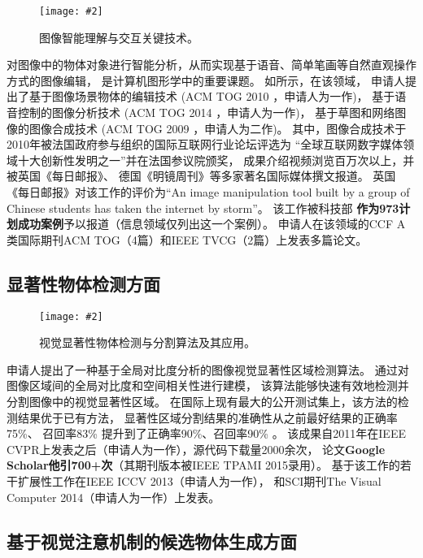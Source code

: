 \documentclass[12pt]{article}
\newcommand{\addImg}[2][1.0]{\texttt{[image: \#2]}}
\newcommand{\myEmph}[1]{\textbf{\textcolor[rgb]{0,0,0.25}{#1}}}
\begin{document}
\begin{figure}[ht]
    \centering
    \addImg[1]{figures/work.jpg}
    \caption{图像智能理解与交互关键技术。}
    \label{fig:interaction}
\end{figure}

对图像中的物体对象进行智能分析，从而实现基于语音、简单笔画等自然直观操作方式的图像编辑，
是计算机图形学中的重要课题。
如所示，在该领域，
申请人提出了基于图像场景物体的编辑技术
(ACM TOG 2010 \cite{ChengZMHH10}，申请人为一作)，
基于语音控制的图像分析技术 
(ACM TOG 2014 \cite{cheng2014imagespirit}，申请人为一作)，
基于草图和网络图像的图像合成技术
(ACM TOG 2009 \cite{cheng2014imagespirit}，申请人为二作)。
其中，图像合成技术于2010年被法国政府参与组织的国际互联网行业论坛评选为
“全球互联网数字媒体领域十大创新性发明之一”并在法国参议院颁奖，
成果介绍视频浏览百万次以上，并被英国《每日邮报》、
德国《明镜周刊》等多家著名国际媒体撰文报道。
英国《每日邮报》对该工作的评价为“An image manipulation tool built by a group 
of Chinese students has taken the internet by storm”。
该工作被科技部 \cite{sketch2PhotoMost} 
\myEmph{作为973计划成功案例}予以报道（信息领域仅列出这一个案例）。
申请人在该领域的CCF A类国际期刊ACM TOG（4篇）和IEEE TVCG（2篇）上发表多篇论文。

\subsection{显著性物体检测方面}

\begin{figure}[ht]
    \centering
    \addImg[1]{figures/sal.jpg}
    \caption{视觉显著性物体检测与分割算法及其应用。}
    \label{fig:salobj}
\end{figure}

申请人提出了一种基于全局对比度分析的图像视觉显著性区域检测算法。
通过对图像区域间的全局对比度和空间相关性进行建模，
该算法能够快速有效地检测并分割图像中的视觉显著性区域。
在国际上现有最大的公开测试集上，该方法的检测结果优于已有方法，
显著性区域分割结果的准确性从之前最好结果的正确率75\%、
召回率83\% 提升到了正确率90\%、召回率90\% 。
该成果自2011年在IEEE CVPR上发表之后（申请人为一作），源代码下载量2000余次，
论文\myEmph{Google Scholar他引700+次}（其期刊版本被IEEE TPAMI 2015录用）。
基于该工作的若干扩展性工作在IEEE ICCV 2013（申请人为一作），
和SCI期刊The Visual Computer 2014（申请人为一作）上发表。


\subsection{基于视觉注意机制的候选物体生成方面}
\end{document}
